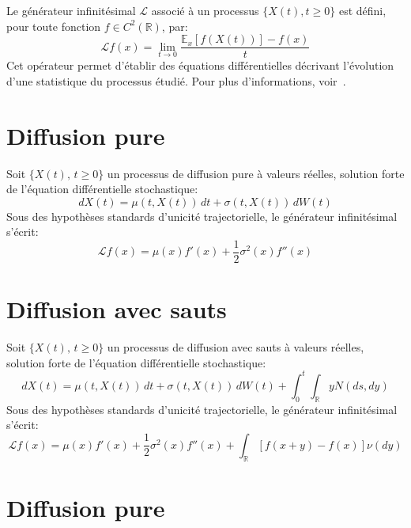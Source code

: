 \label{infinitesimal_generator}

Le générateur infinitésimal \( \mathcal{L} \) associé à un processus \( \{X(t), t\geq0\} \) est défini, pour toute fonction \( f \in C^2(\mathds{R}) \), par:
\[
    \mathcal{L}f(x) = \lim_{t \to 0} \frac{\mathds{E}_x[f(X(t))] - f(x)}{t}
\]
Cet opérateur permet d'établir des équations différentielles décrivant l'évolution d'une statistique du processus étudié. Pour plus d'informations, voir~\cite{bakry2014}.

\section*{Diffusion pure}

Soit \( \{X(t),\, t \geq 0\} \) un processus de diffusion pure à valeurs réelles, solution forte de l'équation différentielle stochastique:
\[
    dX(t) = \mu(t,X(t))\,dt + \sigma(t,X(t))\,dW(t)
\]
Sous des hypothèses standards d'unicité trajectorielle, le générateur infinitésimal s'écrit:
\[
    \mathcal{L}f(x) = \mu(x) f'(x) + \frac{1}{2} \sigma^2(x) f''(x)
\]

\section*{Diffusion avec sauts}

Soit \( \{X(t),\, t \geq 0\} \) un processus de diffusion avec sauts à valeurs réelles, solution forte de l'équation différentielle stochastique:
\[
    dX(t) = \mu(t, X(t))\,dt + \sigma(t, X(t))\,dW(t) + \int_0^t\int_{\mathds{R}} yN(ds,dy)
\]
Sous des hypothèses standards d'unicité trajectorielle, le générateur infinitésimal s'écrit:
\[
    \mathcal{L}f(x) = \mu(x) f'(x) + \frac{1}{2} \sigma^2(x) f''(x) + \int_{\mathds{R}} \left[f(x+y) - f(x)\right] \nu(dy)
\]

\label{trajecotry_uniqueness}

\section*{Diffusion pure}

